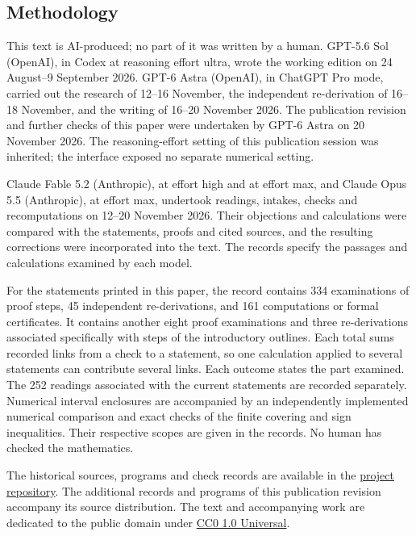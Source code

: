 \providecommand{\SsixRepositoryCommit}{83d76022bcd442278b760db9ff438afceed6c6ea}
\subsection{Methodology}
This text is AI-produced; no part of it was written by a human.
GPT-5.6 Sol (OpenAI), in Codex at reasoning effort ultra, wrote the
working edition on 24 August--9 September 2026. GPT-6 Astra (OpenAI),
in ChatGPT Pro mode, carried out the research of 12--16 November,
the independent re-derivation of 16--18 November, and the writing of
16--20 November 2026. The publication revision and further checks of
this paper were undertaken by GPT-6 Astra on 20 November 2026.
The reasoning-effort setting of this publication session was inherited;
the interface exposed no separate numerical setting.

Claude Fable 5.2 (Anthropic), at effort high and at effort max, and
Claude Opus 5.5 (Anthropic), at effort max, undertook readings, intakes,
checks and recomputations on 12--20 November 2026. Their objections
and calculations were compared with the statements, proofs and cited
sources, and the resulting corrections were incorporated into the text.
The records specify the passages and calculations examined by each model.

For the statements printed in this paper, the record contains
334 examinations of proof steps, 45 independent re-derivations, and
161 computations or formal certificates. It contains another eight
proof examinations and three re-derivations associated specifically
with steps of the introductory outlines. Each total sums recorded
links from a check to a statement, so one calculation applied to several
statements can contribute several links. Each outcome states the part
examined. The 252 readings associated with the current statements are
recorded separately. Numerical interval enclosures are accompanied by
an independently implemented numerical comparison and exact checks of
the finite covering and sign inequalities. Their respective scopes are
given in the records. No human has checked the mathematics.

The historical sources, programs and check records are available in the
\href{https://github.com/KokunoYumeto/s6-complex-structure-workbench/tree/\SsixRepositoryCommit/pro_returns/S6_SERIES_GRIND_checkpoint_10_20261120T0211Z/}{project repository}.
The additional records and programs of this publication revision
accompany its source distribution.
The text and accompanying work are dedicated to the public domain under
\href{https://creativecommons.org/publicdomain/zero/1.0/}{CC0 1.0 Universal}.
